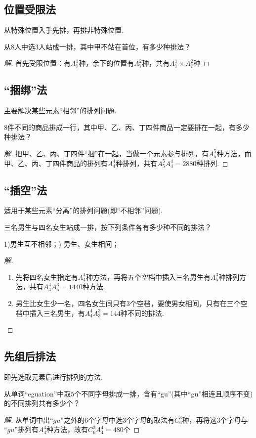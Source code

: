 \documentclass{BHCexam}
\begin{document}
\subsection{位置受限法}
 从特殊位置入手先排，再排非特殊位置.\par
\begin{example}
从$8$人中选$3$人站成一排，其中甲不站在首位，有多少种排法？
\end{example}
\begin{proof}[解]
首先受限位置：有$A_7^1$种，余下的位置有$ A_7^2 $种，共有$ A_7^1\times A_7^2 $种
\end{proof}
\subsection{“捆绑”法}
主要解决某些元素“相邻”的排列问题.\par
\begin{example}
$ 8 $件不同的商品排成一行，其中甲、乙、丙、丁四件商品一定要排在一起，有多少种排法？
\end{example}
\begin{proof}[解]
把甲、乙、丙、丁四件“捆”在一起，当做一个元素参与排列，有$ A_5^5 $种方法，而甲、乙、丙、丁四件商品的排列有$ A_4^4 $种排列，共有$ A_5^5A_4^4=2880 $种排列.
\end{proof}
\subsection{“插空”法}
适用于某些元素“分离”的排列问题(即“不相邻”问题).\par 
\begin{example}
三名男生与四名女生站成一排，按下列条件各有多少种不同的排法？\par
1)男生互不相邻；) 男生、女生相间；
\end{example}
\begin{proof}[解]
\begin{enumerate}[1)]
\item 先将四名女生指定有$ A_4^4 $种方法，再将五个空档中插入三名男生有$ A_5^3 $种排列方法，共有$ A_4^4A_5^3 =1440$种方法.
\item 男生比女生少一名，四名女生间只有$3$个空档，要使男女相间，只有在三个空档中插入三名男生，有$ A_4^4A_3^3 =144$种不同的排法.
\end{enumerate}
\end{proof}
\subsection{先组后排法}
即先选取元素后进行排列的方法.\par
\begin{example}
从单词“eguation”中取$ 5 $个不同字母排成一排，含有“gu”(其中“gu”相连且顺序不变)的不同排列共有多少个？
\end{example}
\begin{proof}[解]
从单词中出$ “gu” $之外的$ 6 $个字母中选$ 3 $个字母的取法有$ C_6^3 $种，再将这$ 3 $个字母与$ “gu” $排列有$ A_4^4 $种方法，故有$ C_6^3A_4^4=480 $个
\end{proof}
\end{document}
